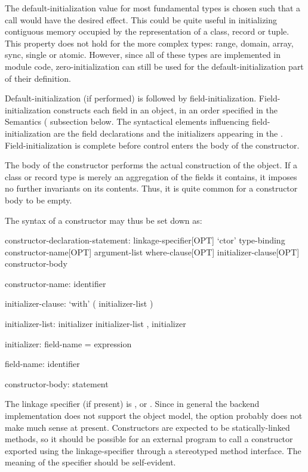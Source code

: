 \begin{note}
The default-initialization value for most fundamental types is chosen such that a 
 call would have the desired effect.  This could be quite useful in
initializing contiguous memory occupied by the representation of a class, record or tuple.
This property does not hold for the more complex types: range, domain, array, sync, single
or atomic.  However, since all of these types are implemented in module code,
zero-initialization can still be used for the default-initialization part of their
definition.
\end{note}

Default-initialization (if performed) is followed by field-initialization.  Field-initialization
constructs each field in an object, in an order specified in the Semantics
( subsection below.  The syntactical elements influencing
field-initialization are the field declarations and the initializers appearing in the
.  Field-initialization is complete before control enters the body
of the constructor.

The body of the constructor performs the actual construction of the object.  If a class or
record type is merely an aggregation of the fields it contains, it imposes no further
invariants on its contents.
Thus, it is quite common for a constructor body to be empty.

The syntax of a constructor may thus be set down as:
\begin{syntax}
constructor-declaration-statement:
  linkage-specifier[OPT] `ctor' type-binding constructor-name[OPT] argument-list 
    where-clause[OPT] initializer-clause[OPT] constructor-body

constructor-name:
  identifier

initializer-clause:
  `with' ( initializer-list )

initializer-list:
  initializer
  initializer-list , initializer

initializer:
  field-name = expression

field-name:
  identifier

constructor-body:
  statement
\end{syntax}

The linkage specifier (if present) is ,  or .  Since
in general the backend implementation does not support the object model, the
 option probably does not make much sense at present.  Constructors are
expected to be statically-linked methods, so it should be possible for an external program
to call a constructor exported using the
 linkage-specifier through a stereotyped method interface.  The meaning of
the  specifier should be self-evident.

